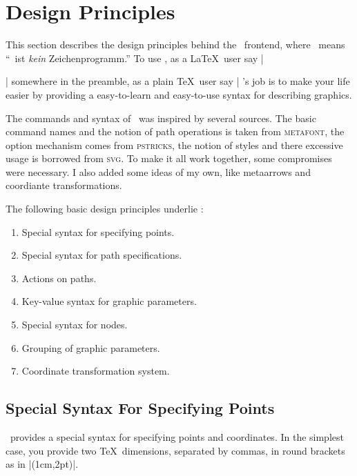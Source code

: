 %


\section{Design Principles}

This section describes the design principles behind the \tikzname\
frontend, where \tikzname\ means ``\tikzname\ ist \emph{kein}
Zeichenprogramm.'' To use \tikzname, as a \LaTeX\ user say
|\usepackage{tikz}| somewhere in the preamble, as a plain \TeX\ user
say | \tikzname's job is to make your life easier by
providing a easy-to-learn and easy-to-use syntax for describing
graphics. 

The commands and syntax of \tikzname\ was inspired by several
sources. The basic command names and the notion of  path operations is
taken from \textsc{metafont}, the option mechanism comes from
\textsc{pstricks}, the notion of styles and there excessive usage is
borrowed from  \textsc{svg}. To make it all work together,
some compromises were necessary. I also added some ideas of my own,
like metaarrows and coordiante transformations.

The following basic design principles underlie \tikzname:
\begin{enumerate}
\item Special syntax for specifying points.
\item Special syntax for path specifications.
\item Actions on paths.
\item Key-value syntax for graphic parameters.
\item Special syntax for nodes.
\item Grouping of graphic parameters.
\item Coordinate transformation system.
\end{enumerate}



\subsection{Special Syntax For Specifying Points}

\tikzname\ provides a special syntax for specifying points and
coordinates. In the simplest case, you provide two \TeX\ dimensions,
separated by commas, in round brackets as in |(1cm,2pt)|.

